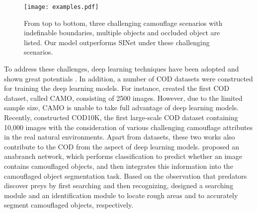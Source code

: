 \documentclass{article}
\begin{document}
\begin{figure}[t]
    \centering{
    }
	\texttt{[image: examples.pdf]}
	\caption{From top to bottom, three challenging camouflage scenarios with indefinable boundaries, multiple objects and occluded object are listed. Our model outperforms SINet \protect\cite{fan2021concealed} under these challenging scenarios.}
    \label{fig:examples}
\end{figure}

To address these challenges, deep learning techniques have been adopted and shown great potentials \cite{anet,fan2021concealed}.
In addition, a number of COD datasets were constructed for training the deep learning models.
For instance, \cite{anet} created the first COD dataset, called CAMO, consisting of 2500 images.
However, due to the limited sample size, CAMO is unable to take full advantage of deep learning models.
Recently, \cite{fan2021concealed} constructed COD10K, the first large-scale COD dataset containing 10,000 images with the consideration of various challenging camouflage attributes in the real natural environments. Apart from datasets, these two works also contribute to the COD from the aspect of deep learning models. \cite{anet} proposed an anabranch network, which performs classification to predict whether an image contains camouflaged objects, and then integrates this information into the camouflaged object segmentation task. Based on the observation that predators discover preys by first searching and then recognizing, \cite{fan2021concealed} designed a searching module and an identification module to locate rough areas and to accurately segment camouflaged objects, respectively.
\end{document}
